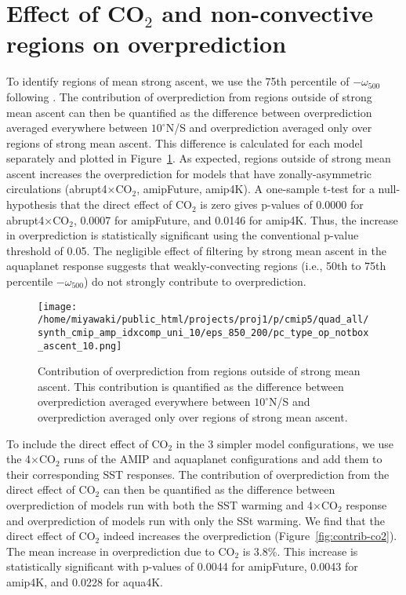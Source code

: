 \documentclass{article}
\begin{document}
\section{Effect of CO$_2$ and non-convective regions on overprediction}

To identify regions of mean strong ascent, we use the 75th percentile of $-\omega_{500}$ following \cite{sherwood-et-al-2014}. The contribution of overprediction from regions outside of strong mean ascent can then be quantified as the difference between overprediction averaged everywhere between $10^\circ$N/S and overprediction averaged only over regions of strong mean ascent. This difference is calculated for each model separately and plotted in Figure~\ref{fig:contrib-ascent}. As expected, regions outside of strong mean ascent increases the overprediction for models that have zonally-asymmetric circulations (abrupt4$\times$CO$_2$, amipFuture, amip4K). A one-sample t-test for a null-hypothesis that the direct effect of CO$_2$ is zero gives p-values of 0.0000 for abrupt4$\times$CO$_2$, 0.0007 for amipFuture, and 0.0146 for amip4K. Thus, the increase in overprediction is statistically significant using the conventional p-value threshold of 0.05. The negligible effect of filtering by strong mean ascent in the aquaplanet response suggests that weakly-convecting regions (i.e., 50th to 75th percentile $-\omega_{500}$) do not strongly contribute to overprediction.

\begin{figure}
    \centering
    \texttt{[image: /home/miyawaki/public\_html/projects/proj1/p/cmip5/quad\_all/synth\_cmip\_amp\_idxcomp\_uni\_10/eps\_850\_200/pc\_type\_op\_notbox\_ascent\_10.png]}
    \caption{Contribution of overprediction from regions outside of strong mean ascent. This contribution is quantified as the difference between overprediction averaged everywhere between $10^\circ$N/S and overprediction averaged only over regions of strong mean ascent.}
    \label{fig:contrib-ascent}
\end{figure}

To include the direct effect of CO$_2$ in the 3 simpler model configurations, we use the 4$\times$CO$_2$ runs of the AMIP and aquaplanet configurations and add them to their corresponding SST responses. The contribution of overprediction from the direct effect of CO$_2$ can then be quantified as the difference between overprediction of models run with both the SST warming and 4$\times$CO$_2$ response and overprediction of models run with only the SSt warming. We find that the direct effect of CO$_2$ indeed increases the overprediction (Figure~\ref{fig:contrib-co2}). The mean increase in overprediction due to CO$_2$ is 3.8\%. This increase is statistically significant with p-values of 0.0044 for amipFuture, 0.0043 for amip4K, and 0.0228 for aqua4K.
\end{document}
